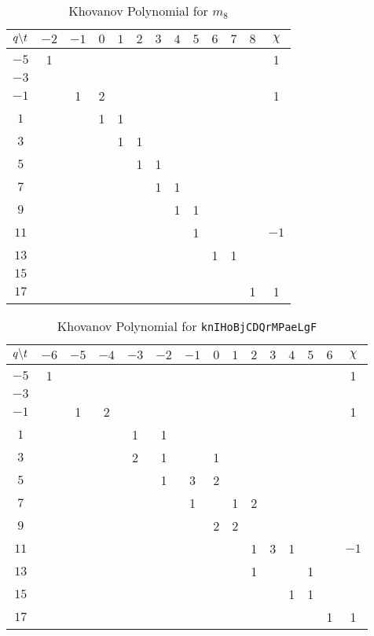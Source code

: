 \begin{table}
    \centering
    \begin{tabular}{| c | c | c | c | c | c | c | c | c | c | c | c | c |}
        \hline
        $q\symbol{92}t$&$-2$&$-1$&$0$&$1$&$2$&$3$&$4$&$5$&$6$&$7$&$8$&$\chi$\\
        \hline
        $-5$&1&&&&&&&&&&&1\\
        \hline
        $-3$&&&&&&&&&&&&\\
        \hline
        $-1$&&1&2&&&&&&&&&1\\
        \hline
        $1$&&&1&1&&&&&&&&\\
        \hline
        $3$&&&&1&1&&&&&&&\\
        \hline
        $5$&&&&&1&1&&&&&&\\
        \hline
        $7$&&&&&&1&1&&&&&\\
        \hline
        $9$&&&&&&&1&1&&&&\\
        \hline
        $11$&&&&&&&&1&&&&$-1$\\
        \hline
        $13$&&&&&&&&&1&1&&\\
        \hline
        $15$&&&&&&&&&&&&\\
        \hline
        $17$&&&&&&&&&&&1&1\\
        \hline
    \end{tabular}
    \caption{Khovanov Polynomial for $m_{8}$}
    \label{table:m_8_kho}
\end{table}
\begin{table}
    \centering
    \begin{tabular}{| c | c | c | c | c | c | c | c | c | c | c | c | c | c | c |}
        \hline
        $q\symbol{92}t$&$-6$&$-5$&$-4$&$-3$&$-2$&$-1$&$0$&$1$&$2$&$3$&$4$&$5$&$6$&$\chi$\\
        \hline
        $-5$&1&&&&&&&&&&&&&1\\
        \hline
        $-3$&&&&&&&&&&&&&&\\
        \hline
        $-1$&&1&2&&&&&&&&&&&1\\
        \hline
        $1$&&&&1&1&&&&&&&&&\\
        \hline
        $3$&&&&2&1&&1&&&&&&&\\
        \hline
        $5$&&&&&1&3&2&&&&&&&\\
        \hline
        $7$&&&&&&1&&1&2&&&&&\\
        \hline
        $9$&&&&&&&2&2&&&&&&\\
        \hline
        $11$&&&&&&&&&1&3&1&&&$-1$\\
        \hline
        $13$&&&&&&&&&1&&&1&&\\
        \hline
        $15$&&&&&&&&&&&1&1&&\\
        \hline
        $17$&&&&&&&&&&&&&1&1\\
        \hline
    \end{tabular}
    \caption{Khovanov Polynomial for \texttt{knIHoBjCDQrMPaeLgF}}
    \label{table:knIHoBjCDQrMPaeLgF_kho}
\end{table}
